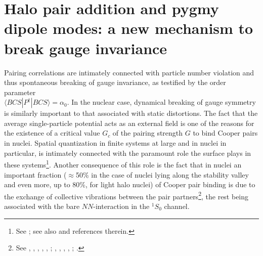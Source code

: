 \section[Halo pair addition mode and pygmy]{Halo pair addition and pygmy dipole modes: a new mechanism to break gauge invariance}\label{App1AF}
Pairing correlations are  intimately connected with particle number violation and thus spontaneous breaking of gauge invariance, as testified by the order parameter\\ \mbox{$\langle BCS|P^{\dagger}|BCS\rangle=\alpha_0$}.  In the nuclear case,  dynamical breaking of gauge symmetry is similarly important to that associated with static distortions. The fact that the average single-particle potential acts as an external field  is one of the reasons for the existence of a critical value $G_c$ of the pairing strength $G$ to bind Cooper pairs in nuclei. Spatial quantization in finite systems at large and in nuclei in particular, is intimately connected with the paramount role the surface plays in these systems\footnote{See \cite{Bohr:75}; see also \cite{Broglia:02d} and references therein.}. Another consequence of this role is  the fact that in nuclei an important fraction ($\approx$50\% in the case of nuclei lying along the stability valley and even more, up to 80\%, for light halo nuclei) of Cooper pair binding is due to the exchange of collective vibrations between the  pair partners\footnote{\label{f53C3} See \cite{Barranco:99}, \cite{Terasaki:02a}, \cite{Brink:05}, \cite{Saperstein:12}, \cite{Avdenkov:12}, \cite{Lombardo:12};  \cite{Barranco:01}, \cite{Potel:10}, \cite{Pankratov:11}, \citet{Barranco:99}, \cite{Idini:15}; \cite{Barranco:05}.}, the rest being associated with the bare $NN$-interaction in the $^1S_0$ channel.  
